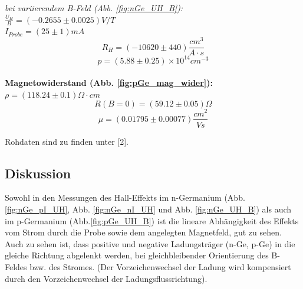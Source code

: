 \documentclass[12pt,a4paper]{article}
\begin{document}
\begin{multicols}{2}


\noindent \emph{bei variierendem B-Feld (Abb. \ref{fig:nGe_UH_B}):}\\

\noindent$\frac{U_H}{B}=(-0.2655 \pm 0.0025)V/T$\\
$I_{Probe}=(25 \pm 1)mA$\\
$$R_H=(-10620 \pm 440)\frac{cm^3}{A\cdot s}$$
$$p=(5.88\pm 0.25)\times 10^{14}cm^{-3}$$\\

\noindent \textbf{Magnetowiderstand (Abb. \ref{fig:pGe_mag_wider}):}\\
$\rho=(118.24 \pm 0.1)\Omega \cdot cm$
$$R(B=0) = (59.12 \pm 0.05)\Omega$$
$$\mu=(0.01795 \pm 0.00077)\frac{cm^2}{Vs}$$



Rohdaten sind zu finden unter [2].

\subsection{Diskussion}

Sowohl in den Messungen des Hall-Effekts im n-Germanium (Abb. \ref{fig:nGe_pI_UH}, Abb. \ref{fig:nGe_nI_UH} und Abb. \ref{fig:nGe_UH_B}) als auch im p-Germanium (Abb.\ref{fig:pGe_UH_B}) ist die lineare Abhängigkeit des Effekts vom Strom durch die Probe sowie dem angelegten Magnetfeld, gut zu sehen.\\
Auch zu sehen ist, dass positive und negative Ladungsträger (n-Ge, p-Ge) in die gleiche Richtung abgelenkt werden, bei gleichbleibender Orientierung des B-Feldes bzw. des Stromes. (Der Vorzeichenwechsel der Ladung wird kompensiert durch den Vorzeichenwechsel der Ladungsflussrichtung).\\


\end{multicols}
\end{document}
